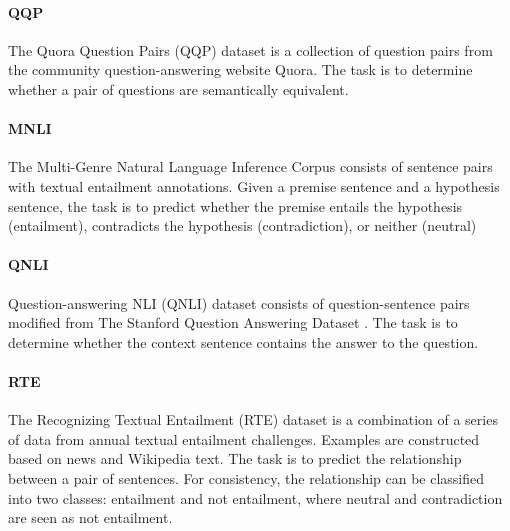\documentclass{article}
\begin{document}
\paragraph{QQP} The Quora Question Pairs (QQP) dataset is a collection of question pairs from the community question-answering website Quora. The task is to determine whether a pair of questions are semantically equivalent.

\paragraph{MNLI} The Multi-Genre Natural Language Inference Corpus \cite{williams2017broad} consists of sentence pairs with textual entailment annotations. Given a premise sentence and a hypothesis sentence, the task is to predict whether the premise entails the hypothesis (entailment), contradicts the hypothesis (contradiction), or neither (neutral)

\paragraph{QNLI} Question-answering NLI (QNLI) dataset consists of question-sentence pairs modified from The Stanford Question Answering Dataset \cite{rajpurkar2016squad}. The task is to determine whether the context sentence contains the answer to the question.

\paragraph{RTE} The Recognizing Textual Entailment (RTE) dataset is a combination of a series of data from annual textual entailment challenges. Examples are constructed based on news and Wikipedia text. The task is to predict the relationship between a pair of sentences. For consistency, the relationship can be classified into two classes: entailment and not entailment, where neutral and contradiction are seen as not entailment.
\end{document}
